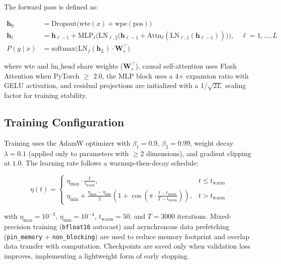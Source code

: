 \documentclass[11pt,a4paper]{article}
\begin{document}
The forward pass is defined as:

\begin{align}
    \mathbf{h}_0 &= \text{Dropout}\big(\text{wte}(x) + \text{wpe}(\text{pos})\big) \\
    \mathbf{h}_\ell &= \mathbf{h}_{\ell-1} + \text{MLP}_\ell\big(\text{LN}_{\ell,2}\big(
        \mathbf{h}_{\ell-1} + \text{Attn}_\ell(\text{LN}_{\ell,1}(\mathbf{h}_{\ell-1}))
    \big)\big), \quad \ell = 1,\dots,L \\
    P(y \mid x) &= \text{softmax}\big(\text{LN}_f(\mathbf{h}_L) \cdot \mathbf{W}_e^\top\big)
\end{align}

where $\text{wte}$ and $\text{lm\_head}$ share weights ($\mathbf{W}_e^\top$),
causal self-attention uses Flash Attention when PyTorch $\geq$ 2.0,
the MLP block uses a 4$\times$ expansion ratio with GELU activation,
and residual projections are initialized with a $1/\sqrt{2L}$ scaling factor for training stability.

\subsection{Training Configuration}

Training uses the AdamW optimizer with $\beta_1 = 0.9$, $\beta_2 = 0.99$,
weight decay $\lambda = 0.1$ (applied only to parameters with $\geq 2$ dimensions),
and gradient clipping at $1.0$.
The learning rate follows a warmup-then-decay schedule:

\begin{equation}
    \eta(t) =
    \begin{cases}
        \eta_{\max} \cdot \frac{t}{t_{\text{warm}}}, & t \leq t_{\text{warm}} \\[4pt]
        \eta_{\min} + \frac{\eta_{\max} - \eta_{\min}}{2}
            \left(1 + \cos\left(\pi \cdot \frac{t - t_{\text{warm}}}{T - t_{\text{warm}}}\right)\right), & t > t_{\text{warm}}
    \end{cases}
\end{equation}

with $\eta_{\max} = 10^{-3}$, $\eta_{\min} = 10^{-4}$, $t_{\text{warm}} = 50$, and $T = 3000$ iterations.
Mixed-precision training (\texttt{bfloat16} autocast) and asynchronous data prefetching
(\texttt{pin\_memory} + \texttt{non\_blocking}) are used to reduce memory footprint and overlap data transfer with computation.
Checkpoints are saved only when validation loss improves, implementing a lightweight form of early stopping.
\end{document}
